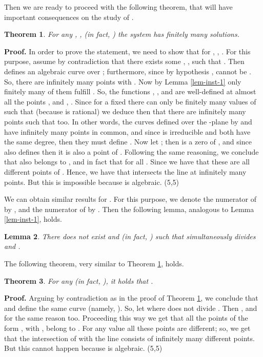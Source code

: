 \documentclass{elsart}
\def\qed{\hfill  \framebox(5,5){}}
\newtheorem{theorem}{{\bf Theorem}}
\newtheorem{lemma}[theorem]{{\bf Lemma}}
\begin{document}
Then we are ready to proceed with the following theorem, that will have important consequences on the study of .

\begin{theorem} \label{th-1}
 For any , , (in fact, ) the system  has finitely many solutions.
\end{theorem}

{\bf Proof.}  In order to prove the statement, we need to show that for , , .
 For this purpose, assume by contradiction
that there exists some , , such that . Then  defines an algebraic curve  over ; furthermore, since by hypothesis ,  cannot be . So, there are infinitely many points  with . Now by Lemma \ref{lem-inst-1} only finitely many of them fulfill . So, the functions , ,  and
 are well-defined at almost all the points , and , . Since for a fixed  there can only be finitely many values
of  such that  (because  is rational) we deduce then that there are infinitely many points 
such that  too. In other words, the curves defined over the -plane by  and  have infinitely many points in common, and since  is irreducible and both have the same degree, then they must
define . Now let ; then
 is a zero of , and since  also defines  then it
is also a point of . Following the same reasoning, we conclude that
 also belongs to , and in fact that  for all . Since  we have that these are all different points of . Hence, we have that  intersects the line  at infinitely many points. But this is impossible because  is
algebraic. \qed

We can obtain similar results for . For this purpose, we denote the numerator of  by , and the numerator of
 by . Then the following lemma, analogous to Lemma \ref{lem-inst-1}, holds.

\begin{lemma} \label{lem-inst-2}
There does not exist  and  (in fact, ) such that  simultaneously divides  and .
\end{lemma}

The following theorem, very similar to Theorem \ref{th-1}, holds.

\begin{theorem} \label{th-2}
 For any  (in fact, ), it holds that .
\end{theorem}

{\bf Proof.} Arguing by contradiction as in the proof of Theorem \ref{th-1}, we conclude that  and  define the
same curve (namely, ). So, let  where  does not divide . Then
, and for the same reason  too. Proceeding
this way we get that all the points of the form , with , belong to  . For any value  all these points are different; so, we get that the intersection of  with the line  consists of infinitely
many different points. But this cannot happen because  is algebraic. \qed
\end{document}
